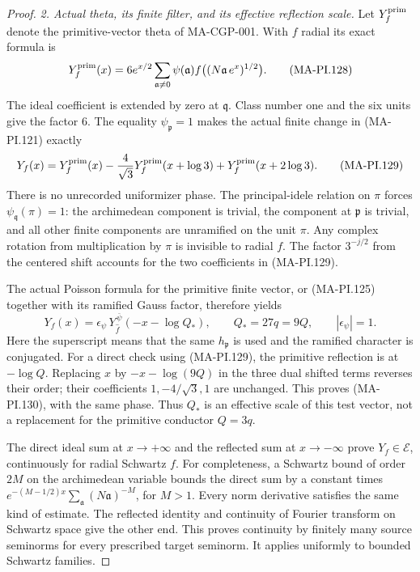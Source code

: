 \begin{proof}
\emph{2. Actual theta, its finite filter, and its effective reflection scale.}
Let $Y_f^{\rm prim}$ denote the primitive-vector theta
of MA-CGP-001.  With $f$ radial its exact formula is
\[
 Y_f^{\rm prim}(x)
    =6e^{x/2}\sum_{\mathfrak a\ne0}
             \psi(\mathfrak a)
                       f\bigl((N\mathfrak a\,e^x)^{1/2}\bigr).
 \tag{MA-PI.128}
\]
The ideal coefficient is extended by zero at $\mathfrak q$.
Class number one and the six units give the factor $6$.
The equality $\psi_{\mathfrak p}=1$ makes the actual
finite change in (MA-PI.121) exactly
\[
 Y_f(x)=Y_f^{\rm prim}(x)
          -\frac4{\sqrt3}Y_f^{\rm prim}(x+\log3)
          +Y_f^{\rm prim}(x+2\log3).
 \tag{MA-PI.129}
\]
There is no unrecorded uniformizer phase.  The principal-idele
relation on $\pi$ forces $\psi_{\mathfrak q}(\pi)=1$:
the archimedean component is trivial, the component at
$\mathfrak p$ is trivial, and all other finite components
are unramified on the unit $\pi$.  Any complex rotation
from multiplication by $\pi$ is invisible to radial $f$.
The factor $3^{-j/2}$ from the centered shift accounts for
the two coefficients in (MA-PI.129).

The actual Poisson formula for the primitive finite vector,
or (MA-PI.125) together with its ramified Gauss factor,
therefore yields
\[
 Y_f(x)=\epsilon_\psi\,Y^{\,\bar\psi}_{\widehat f}
                     (-x-\log Q_*),\qquad
 Q_*=27q=9Q,\qquad |\epsilon_\psi|=1.
 \tag{MA-PI.130}
\]
Here the superscript means that the same $h_{\mathfrak p}$
is used and the ramified character is conjugated.
For a direct check using (MA-PI.129), the primitive
reflection is at $-\log Q$.  Replacing $x$ by
$-x-\log(9Q)$ in the three dual shifted terms reverses
their order; their coefficients $1,-4/\sqrt3,1$ are
unchanged.  This proves (MA-PI.130), with the same phase.
Thus $Q_*$ is an effective scale of this test vector,
not a replacement for the primitive conductor $Q=3q$.

The direct ideal sum at $x\to+\infty$ and the reflected
sum at $x\to-\infty$ prove
$Y_f\in\mathcal E$, continuously for radial Schwartz $f$.
For completeness, a Schwartz bound of order $2M$ on the
archimedean variable bounds the direct sum by a constant
times $e^{-(M-1/2)x}\sum_{\mathfrak a}(N\mathfrak a)^{-M}$,
for $M>1$.  Every norm derivative satisfies the same kind
of estimate.  The reflected identity and continuity of
Fourier transform on Schwartz space give the other end.
This proves continuity by finitely many source seminorms
for every prescribed target seminorm.  It applies uniformly
to bounded Schwartz families.


\end{proof}
